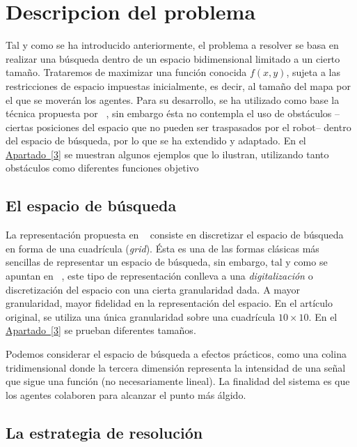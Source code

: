 \documentclass[runningheads]{llncs}
\newcommand{\refcruzada}[2]{\hyperref[#2]{#1~\ref{#2}}}
\begin{document}
    \section{Descripcion del problema}
    \label{sec:descripcion}

    Tal y como se ha introducido anteriormente, el problema a resolver se basa en realizar una búsqueda dentro de un espacio bidimensional limitado a un cierto tamaño. Trataremos de maximizar una función conocida $f(x,y)$, sujeta a las restricciones de espacio impuestas inicialmente, es decir, al tamaño del mapa por el que se moverán los agentes.
    Para su desarrollo, se ha utilizado como base la técnica propuesta por ~\cite{initialPaper}, sin embargo ésta no contempla el uso de obstáculos --ciertas posiciones del espacio que no pueden ser traspasados por el robot-- dentro del espacio de búsqueda, por lo que se ha extendido y adaptado.
    En el \refcruzada{Apartado}{3} se muestran algunos ejemplos que lo ilustran, utilizando tanto obstáculos como diferentes funciones objetivo %


    \subsection{El espacio de búsqueda}
    La representación propuesta en ~\cite{initialPaper} consiste en discretizar el espacio de búsqueda en forma de una cuadrícula (\textit{grid}). Ésta es una de las formas clásicas más sencillas de representar un espacio de búsqueda, sin embargo, tal y como se apuntan en ~\cite{AIRobotics}, este tipo de representación conlleva a una \textit{digitalización} o discretización del espacio con una cierta granularidad dada. A mayor granularidad, mayor fidelidad en la representación del espacio. En el artículo original, se utiliza una única granularidad sobre una cuadrícula $10 \times 10$. En el \refcruzada{Apartado}{3} se prueban diferentes tamaños. %

    Podemos considerar el espacio de búsqueda a efectos prácticos, como una colina tridimensional donde la tercera dimensión representa la intensidad de una señal que sigue una función (no necesariamente lineal). La finalidad del sistema es que los agentes colaboren para alcanzar el punto más álgido.

    \subsection{La estrategia de resolución}
\end{document}
